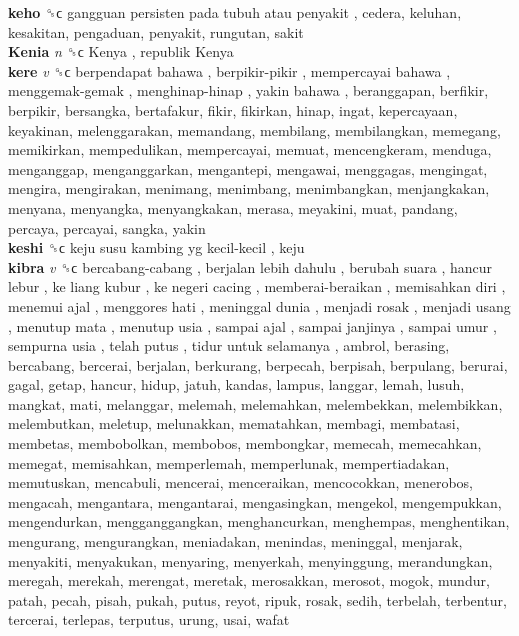 \textbf{keho} ␝ϲ   gangguan persisten pada tubuh atau penyakit , cedera, keluhan, kesakitan, pengaduan, penyakit, rungutan, sakit  \\
\textbf{Kenia} \emph{n}  ␝ϲ   Kenya ,  republik Kenya   \\
\textbf{kere} \emph{v}  ␝ϲ   berpendapat bahawa ,  berpikir-pikir ,  mempercayai bahawa ,  menggemak-gemak ,  menghinap-hinap ,  yakin bahawa , beranggapan, berfikir, berpikir, bersangka, bertafakur, fikir, fikirkan, hinap, ingat, kepercayaan, keyakinan, melenggarakan, memandang, membilang, membilangkan, memegang, memikirkan, mempedulikan, mempercayai, memuat, mencengkeram, menduga, menganggap, menganggarkan, mengantepi, mengawai, menggagas, mengingat, mengira, mengirakan, menimang, menimbang, menimbangkan, menjangkakan, menyana, menyangka, menyangkakan, merasa, meyakini, muat, pandang, percaya, percayai, sangka, yakin  \\
\textbf{keshi} ␝ϲ   keju susu kambing yg kecil-kecil , keju  \\
\textbf{kibra} \emph{v}  ␝ϲ   bercabang-cabang ,  berjalan lebih dahulu ,  berubah suara ,  hancur lebur ,  ke liang kubur ,  ke negeri cacing ,  memberai-beraikan ,  memisahkan diri ,  menemui ajal ,  menggores hati ,  meninggal dunia ,  menjadi rosak ,  menjadi usang ,  menutup mata ,  menutup usia ,  sampai ajal ,  sampai janjinya ,  sampai umur ,  sempurna usia ,  telah putus ,  tidur untuk selamanya , ambrol, berasing, bercabang, bercerai, berjalan, berkurang, berpecah, berpisah, berpulang, berurai, gagal, getap, hancur, hidup, jatuh, kandas, lampus, langgar, lemah, lusuh, mangkat, mati, melanggar, melemah, melemahkan, melembekkan, melembikkan, melembutkan, meletup, melunakkan, mematahkan, membagi, membatasi, membetas, membobolkan, membobos, membongkar, memecah, memecahkan, memegat, memisahkan, memperlemah, memperlunak, mempertiadakan, memutuskan, mencabuli, mencerai, menceraikan, mencocokkan, menerobos, mengacah, mengantara, mengantarai, mengasingkan, mengekol, mengempukkan, mengendurkan, mengganggangkan, menghancurkan, menghempas, menghentikan, mengurang, mengurangkan, meniadakan, menindas, meninggal, menjarak, menyakiti, menyakukan, menyaring, menyerkah, menyinggung, merandungkan, meregah, merekah, merengat, meretak, merosakkan, merosot, mogok, mundur, patah, pecah, pisah, pukah, putus, reyot, ripuk, rosak, sedih, terbelah, terbentur, tercerai, terlepas, terputus, urung, usai, wafat  \\
